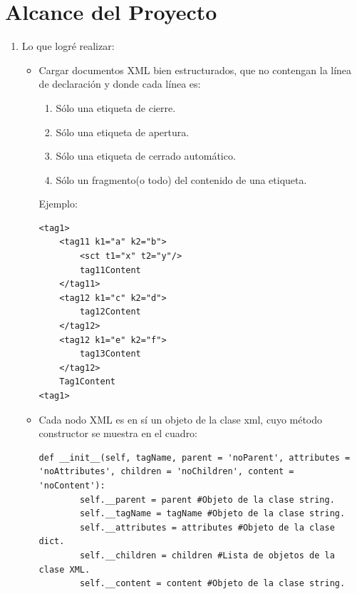 \documentclass[../main.tex]{subfiles}
\begin{document}
\section{Alcance del Proyecto}
\begin{enumerate}

\item Lo que logré realizar:
	\begin{itemize}
	\item Cargar documentos XML bien estructurados, que no contengan la línea de declaración y donde cada línea es:
	\begin{enumerate}
		\item Sólo una etiqueta de cierre.
		\item Sólo una etiqueta de apertura.
		\item Sólo una etiqueta de cerrado automático.
		\item Sólo un fragmento(o todo) del contenido de una etiqueta.
	\end{enumerate}
	Ejemplo:
	\lstset{language=XML}
		\begin{lstlisting}[caption= Documento que la aplicación si logra cargar, frame=none]
<tag1>
	<tag11 k1="a" k2="b">
		<sct t1="x" t2="y"/>
		tag11Content
	</tag11>
	<tag12 k1="c" k2="d">
		tag12Content
	</tag12>
	<tag12 k1="e" k2="f">
		tag13Content
	</tag12>
	Tag1Content
<tag1>
		\end{lstlisting}
	\clearpage
	\item Cada nodo XML es en sí un objeto de la clase xml, cuyo método constructor se muestra en el cuadro:
		\lstset{language=Python}
		\begin{lstlisting}[caption= Método constructor de la clase xml, frame=none]
	def __init__(self, tagName, parent = 'noParent', attributes = 'noAttributes', children = 'noChildren', content = 'noContent'):
		self.__parent = parent #Objeto de la clase string.
		self.__tagName = tagName #Objeto de la clase string.
		self.__attributes = attributes #Objeto de la clase dict.
		self.__children = children #Lista de objetos de la clase XML.
		self.__content = content #Objeto de la clase string.
		\end{lstlisting}
	

\end{itemize}
\end{enumerate}
\end{document}
